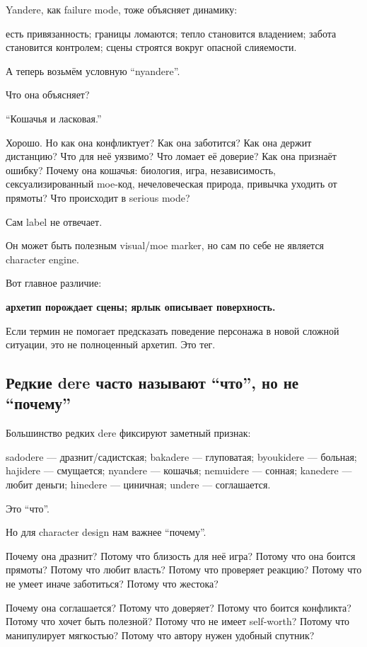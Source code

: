 Yandere, как failure mode, тоже объясняет динамику:

есть привязанность; границы ломаются; тепло становится владением; забота
становится контролем; сцены строятся вокруг опасной слияемости.

А теперь возьмём условную ``nyandere''.

Что она объясняет?

``Кошачья и ласковая.''

Хорошо. Но как она конфликтует? Как она заботится? Как она держит
дистанцию? Что для неё уязвимо? Что ломает её доверие? Как она признаёт
ошибку? Почему она кошачья: биология, игра, независимость,
сексуализированный moe-код, нечеловеческая природа, привычка уходить от
прямоты? Что происходит в serious mode?

Сам label не отвечает.

Он может быть полезным visual/\hspace{0pt}moe marker, но сам по себе не является
character engine.

Вот главное различие:

\textbf{архетип порождает сцены; ярлык описывает поверхность.}

Если термин не помогает предсказать поведение персонажа в новой сложной
ситуации, это не полноценный архетип. Это тег.

\subsection*{Редкие dere часто называют ``что'', но не ``почему''}

Большинство редких dere фиксируют заметный признак:

sadodere --- дразнит/\hspace{0pt}садистская; bakadere --- глуповатая; byoukidere ---
больная; hajidere --- смущается; nyandere --- кошачья; nemuidere ---
сонная; kanedere --- любит деньги; hinedere --- циничная; undere ---
соглашается.

Это ``что''.

Но для character design нам важнее ``почему''.

Почему она дразнит? Потому что близость для неё игра? Потому что она
боится прямоты? Потому что любит власть? Потому что проверяет реакцию?
Потому что не умеет иначе заботиться? Потому что жестока?

Почему она соглашается? Потому что доверяет? Потому что боится
конфликта? Потому что хочет быть полезной? Потому что не имеет
self-worth? Потому что манипулирует мягкостью? Потому что автору нужен
удобный спутник?

